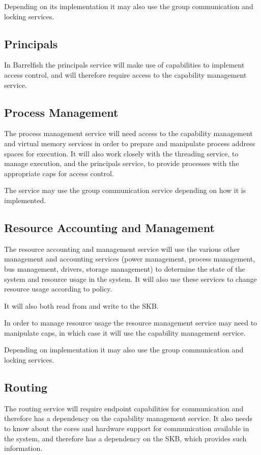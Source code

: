 \documentclass[a4paper,twoside]{report} %
\begin{document}
Depending on its implementation it may also use the group
communication and locking services.

\subsection{Principals}

In Barrelfish the principals service will make use of capabilities to
implement access control, and will therefore require access to the
capability management service.

\subsection{Process Management}

The process management service will need access to the capability
management and virtual memory services in order to prepare and
manipulate process address spaces for execution. It will also work
closely with the threading service, to manage execution, and the
principals service, to provide processes with the appropriate caps for
access control.

The service may use the group communication service depending on how
it is implemented.

\subsection{Resource Accounting and Management}

The resource accounting and management service will use the various
other management and accounting services (power management, process
management, bus management, drivers, storage management) to determine
the state of the system and resource usage in the system.  It will
also use these services to change resource usage according to policy.

It will also both read from and write to the SKB.

In order to manage resource usage the resource management service may
need to manipulate caps, in which case it will use the capability
management service.

Depending on implementation it may also use the group communication and
locking services.

\subsection{Routing}

The routing service will require endpoint capabilities for communication
and therefore has a dependency on the capability management service.
It also needs to know about the cores and hardware support for
communication available in the system, and therefore has a dependency
on the SKB, which provides such information.
\end{document}
